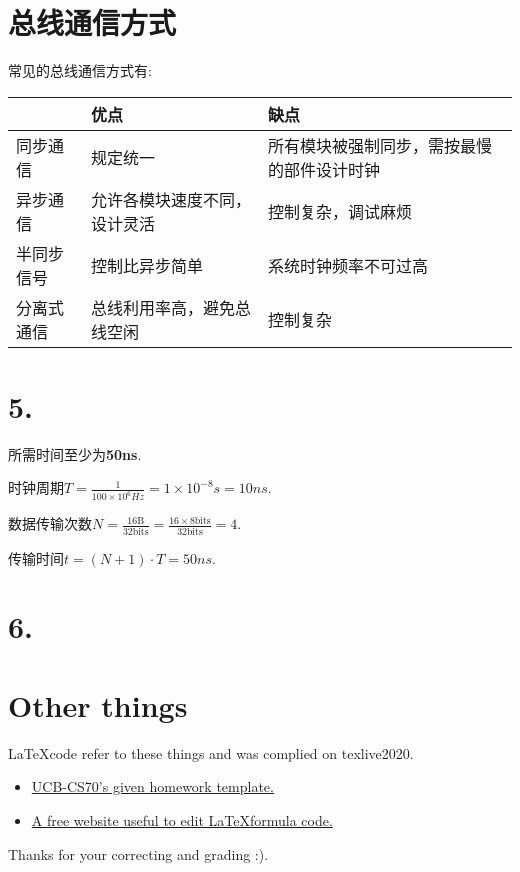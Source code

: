 \documentclass[11pt]{article}  %
\begin{document}
\section{总线通信方式}
常见的总线通信方式有: 

\begin{table}[H]
    \begin{tabular}{|l|l|l|}
        \hline
            & 优点             & 缺点                    \\ \hline
        同步通信  & 规定统一           & 所有模块被强制同步，需按最慢的部件设计时钟 \\ \hline
        异步通信  & 允许各模块速度不同，设计灵活 & 控制复杂，调试麻烦             \\ \hline
        半同步信号 & 控制比异步简单        & 系统时钟频率不可过高            \\ \hline
        分离式通信 & 总线利用率高，避免总线空闲  & 控制复杂                  \\ \hline
    \end{tabular}
\end{table}

\section*{5.}
所需时间至少为\textbf{50ns}.

时钟周期$\displaystyle T=\frac{1}{100\times 10^6Hz} = 1\times 10^{-8}s = 10ns$.

数据传输次数$\displaystyle N = \frac{16 \text{B}}{32 \text{bits}}=\frac{16\times 8 \text{bits}}{32 \text{bits}} = 4$.

传输时间$t = (N+1)\cdot T = 50ns$.

\section*{6.}


\section*{Other things}

\LaTeX \space code refer to these things and was complied on texlive2020.
\begin{itemize}
    \item  \href{https://www.eecs70.org/assets/misc/homework_template.tex}{UCB-CS70's given homework template.} 
    \item  \href{https://www.latexlive.com}{A free website useful to edit \LaTeX \space formula code.}
\end{itemize}


Thanks for your correcting and grading :).
\end{document}
